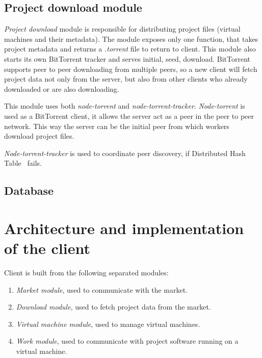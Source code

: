 \subsection{Project download module}
\label{s:project_download_module}

\emph{Project download} module is responsible for distributing project files (virtual machines and their metadata). The module exposes only one function, that takes project metadata and returns a \emph{.torrent} file to return to client. This module also starts its own BitTorrent tracker and serves initial, seed, download. BitTorrent supports peer to peer downloading from multiple peers, so a new client will fetch project data not only from the server, but also from other clients who already downloaded or are also downloading.

This module uses both \emph{node-torrent} and \emph{node-torrent-tracker}. \emph{Node-torrent} is used as a BitTorrent client, it allows the server act as a peer in the peer to peer network. This way the server can be the initial peer from which workers download project files.

\emph{Node-torrent-tracker} is used to coordinate peer discovery, if Distributed Hash Table~\cite{loewenstern2008dht} fails.

\subsection{Database}
\label{s:database}

\section{Architecture and implementation of the client}

Client is built from the following separated modules:

\begin{enumerate}
\item \emph{Market module}, used to communicate with the market.
\item \emph{Download module}, used to fetch project data from the market.
\item \emph{Virtual machine module}, used to manage virtual machines.
\item \emph{Work module}, used to communicate with project software running on a virtual machine.
\end{enumerate}

